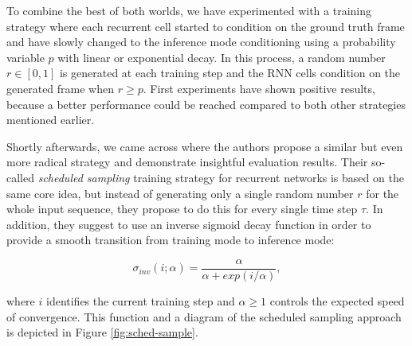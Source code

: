 To combine the best of both worlds, we have experimented with a training strategy where each recurrent cell started to condition on the ground truth frame and have slowly changed to the inference mode conditioning using a probability variable $p$ with linear or exponential decay. In this process, a random number $r \in [0, 1]$ is generated at each training step and the RNN cells condition on the generated frame when $r \geq p$. First experiments have shown positive results, because a better performance could be reached compared to both other strategies mentioned earlier. 

Shortly afterwards, we came across \parencite{sched_sample} where the authors propose a similar but even more radical strategy and demonstrate insightful evaluation results. Their so-called \textit{scheduled sampling} training strategy for recurrent networks is based on the same core idea, but instead of generating only a single random number $r$ for the whole input sequence, they propose to do this for every single time step $\tau$. In addition, they suggest to use an inverse sigmoid decay function in order to provide a smooth transition from training mode to inference mode:

\begin{equation} \label{eq:inverse-sigmoid}
\sigma_{inv}(i; \alpha) = \frac{\alpha}{\alpha + exp(i / \alpha)} ,
\end{equation}

where $i$ identifies the current training step and $\alpha \geq 1$ controls the expected speed of convergence. This function and a diagram of the scheduled sampling approach is depicted in Figure \ref{fig:sched-sample}.

